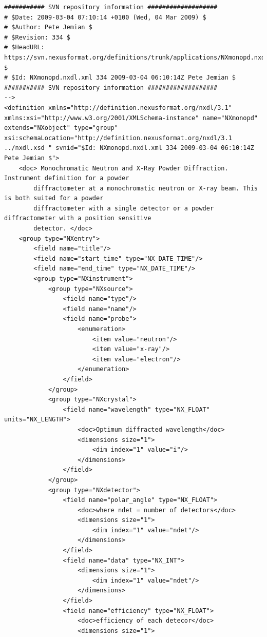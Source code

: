 \documentclass[a4paper]{article}\usepackage[dvips]{graphicx}
\begin{document}
\begin{verbatim}
########### SVN repository information ###################
# $Date: 2009-03-04 07:10:14 +0100 (Wed, 04 Mar 2009) $
# $Author: Pete Jemian $
# $Revision: 334 $
# $HeadURL: https://svn.nexusformat.org/definitions/trunk/applications/NXmonopd.nxdl.xml $
# $Id: NXmonopd.nxdl.xml 334 2009-03-04 06:10:14Z Pete Jemian $
########### SVN repository information ###################
-->
<definition xmlns="http://definition.nexusformat.org/nxdl/3.1" xmlns:xsi="http://www.w3.org/2001/XMLSchema-instance" name="NXmonopd" extends="NXobject" type="group" xsi:schemaLocation="http://definition.nexusformat.org/nxdl/3.1 ../nxdl.xsd " svnid="$Id: NXmonopd.nxdl.xml 334 2009-03-04 06:10:14Z Pete Jemian $">
    <doc> Monochromatic Neutron and X-Ray Powder Diffraction. Instrument definition for a powder
        diffractometer at a monochromatic neutron or X-ray beam. This is both suited for a powder
        diffractometer with a single detector or a powder diffractometer with a position sensitive
        detector. </doc>
    <group type="NXentry">
        <field name="title"/>
        <field name="start_time" type="NX_DATE_TIME"/>
        <field name="end_time" type="NX_DATE_TIME"/>
        <group type="NXinstrument">
            <group type="NXsource">
                <field name="type"/>
                <field name="name"/>
                <field name="probe">
                    <enumeration>
                        <item value="neutron"/>
                        <item value="x-ray"/>
                        <item value="electron"/>
                    </enumeration>
                </field>
            </group>
            <group type="NXcrystal">
                <field name="wavelength" type="NX_FLOAT" units="NX_LENGTH">
                    <doc>Optimum diffracted wavelength</doc>
                    <dimensions size="1">
                        <dim index="1" value="i"/>
                    </dimensions>
                </field>
            </group>
            <group type="NXdetector">
                <field name="polar_angle" type="NX_FLOAT">
                    <doc>where ndet = number of detectors</doc>
                    <dimensions size="1">
                        <dim index="1" value="ndet"/>
                    </dimensions>
                </field>
                <field name="data" type="NX_INT">
                    <dimensions size="1">
                        <dim index="1" value="ndet"/>
                    </dimensions>
                </field>
                <field name="efficiency" type="NX_FLOAT">
                    <doc>efficiency of each detecor</doc>
                    <dimensions size="1">

\end{verbatim}
\end{document}
